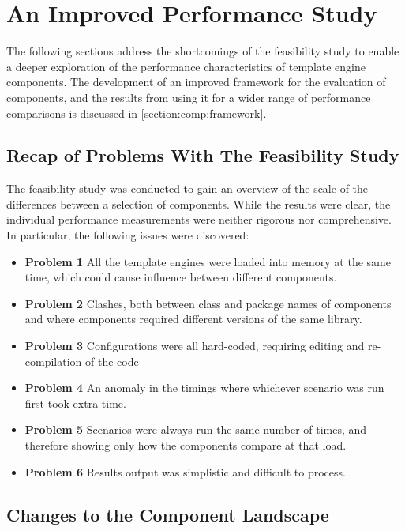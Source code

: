 \section{An Improved Performance Study}
\label{section:fs2}

The following sections address the shortcomings of the feasibility study to enable a deeper exploration of the performance characteristics of template engine components.  The development of an improved framework for the evaluation of components, and the results from using it for a wider range of performance comparisons is discussed in \autoref{section:comp:framework}.

\subsection{Recap of Problems With The Feasibility Study}
\label{section:comp:recap}

The feasibility study was conducted to gain an overview of the scale of the differences between a selection of components. While the results were clear, the individual performance measurements were neither rigorous nor comprehensive. In particular, the following issues were discovered:

\begin{itemize}
    \item \textbf{Problem 1} All the template engines were loaded into memory at the same time, which could cause influence between different components.
    \item \textbf{Problem 2} Clashes, both between class and package names of components and where components required different versions of the same library.
    \item \textbf{Problem 3} Configurations were all hard-coded, requiring editing and re-compilation of the code   \item \textbf{Problem 4} An anomaly in the timings where whichever scenario was run first took extra time.
    \item \textbf{Problem 5} Scenarios were always run the same number of times, and therefore showing only how the components compare at that load.
    \item \textbf{Problem 6} Results output was simplistic and difficult to process.
\end{itemize}

\subsection{Changes to the Component Landscape}

